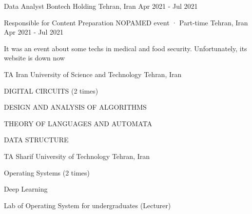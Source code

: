 

\begin{cventries}

  \cventry
    {Data Analyst} %
    {Bontech Holding} %
    {Tehran, Iran} %
    {Apr 2021 - Jul 2021} %
    {}

  \cventry
    {Responsible for Content Preparation} %
    {NOPAMED event · Part-time} %
    {Tehran, Iran} %
    {Apr 2021 - Jul 2021} %
    {
      \begin{cvitems} %
        \item It was an event about some techs in medical and food security. Unfortunately, its website is down now
      \end{cvitems}
    }
    
    \cventry
    {TA} %
    {Iran University of Science and Technology} %
    {Tehran, Iran} %
    {} %
    {
      \begin{cvitems} %
        \item DIGITAL CIRCUITS (2 times)
        \item DESIGN AND ANALYSIS OF ALGORITHMS
        \item THEORY OF LANGUAGES AND AUTOMATA
        \item DATA STRUCTURE
      \end{cvitems}
    }

    \cventry
    {TA} %
    {Sharif University of Technology} %
    {Tehran, Iran} %
    {} %
    {
      \begin{cvitems} %
        \item Operating Systems (2 times)
        \item Deep Learning
        \item Lab of Operating System for undergraduates (Lecturer)
      \end{cvitems}
    }
    

\end{cventries}
